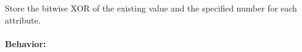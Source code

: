Store the bitwise XOR of the existing value and the specified number for each
attribute.

\paragraph{Behavior:}
\begin{itemize}[noitemsep]

\end{itemize}

